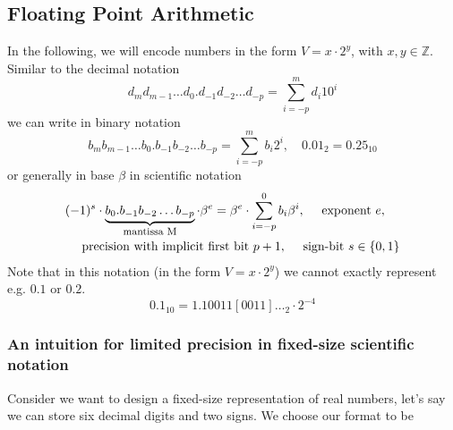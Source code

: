 \subsection{Floating Point Arithmetic}
In the following, we will encode numbers in the form $V = x \cdot 2^y$, with $x,y \in \mathbb{Z}$. Similar to the decimal notation
\begin{equation}
    d_m d_{m-1} \dots d_0 . d_{-1} d_{-2} \dots d_{-p} = \sum_{i=-p}^m d_i 10^i
\end{equation}
we can write in binary notation
\begin{equation}
    b_m b_{m-1} \dots b_0 . b_{-1} b_{-2} \dots b_{-p} = \sum_{i=-p}^m b_i 2^i, \quad 0.01_2 = 0.25_{10}
\end{equation}
or generally in base $\beta$ in scientific notation
\begin{equation}
    \begin{multlined}
        (-1) ^ s \cdot \explain{b_0 . b_{-1} b_{-2} \dots b_{-p}}{mantissa M} \cdot \beta^e = \beta^e \cdot \sum_{i=-p}^0 b_i \beta^i, \quad \text{ exponent } e,\\ \text{ precision with implicit first bit } p+1, \quad \text{ sign-bit } s \in \{0,1\}
    \end{multlined}
\end{equation}
Note that in this notation (in the form $V = x \cdot 2^y$) we cannot exactly represent e.g. $0.1$ or $0.2$.
\begin{equation}
    0.1_{10} = 1.10011[0011]\dots_2 \cdot 2^{-4}
\end{equation}

\subsubsection{An intuition for limited precision in fixed-size scientific notation}
Consider we want to design a fixed-size representation of real numbers, let's say we can store six decimal digits and two signs.
We choose our format to be

